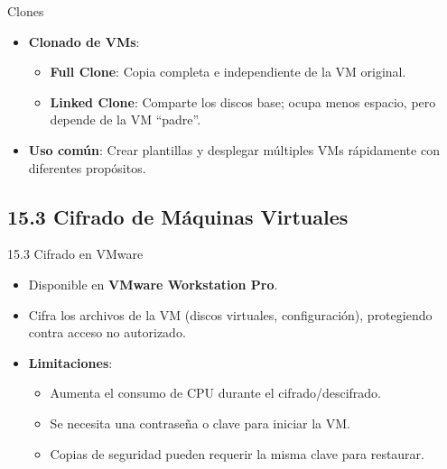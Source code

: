 \documentclass{beamer}
\begin{document}
\begin{frame}{Clones}
    \begin{itemize}
        \item \textbf{Clonado de VMs}:
            \begin{itemize}
                \item \textbf{Full Clone}: Copia completa e independiente de la VM original.
                \item \textbf{Linked Clone}: Comparte los discos base; ocupa menos espacio, pero depende de la VM “padre”.
            \end{itemize}
        \item \textbf{Uso común}: Crear plantillas y desplegar múltiples VMs rápidamente con diferentes propósitos.
    \end{itemize}
\end{frame}

\subsection{15.3 Cifrado de Máquinas Virtuales}
\begin{frame}{15.3 Cifrado en VMware}
    \begin{itemize}
        \item Disponible en \textbf{VMware Workstation Pro}.
        \item Cifra los archivos de la VM (discos virtuales, configuración), protegiendo contra acceso no autorizado.
        \item \textbf{Limitaciones}:
            \begin{itemize}
                \item Aumenta el consumo de CPU durante el cifrado/descifrado.
                \item Se necesita una contraseña o clave para iniciar la VM.
                \item Copias de seguridad pueden requerir la misma clave para restaurar.
            \end{itemize}
    \end{itemize}
\end{frame}

\end{document}
